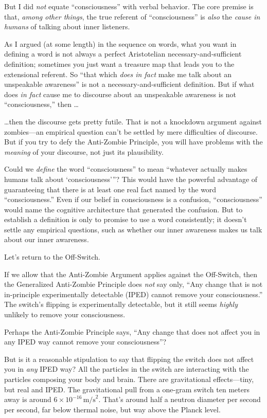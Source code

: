 {
 But I did \textit{not} equate
``consciousness'' with verbal
behavior. The core premise is that, \textit{among other things}, the
true referent of ``consciousness''
is \textit{also} the \textit{cause in humans} of talking about inner
listeners.}

{
 As I argued (at some length) in the sequence on words, what you
want in defining a word is not always a perfect Aristotelian
necessary-and-sufficient definition; sometimes you just want a treasure
map that leads you to the extensional referent. So
``that which \textit{does in fact} make me talk about
an unspeakable awareness'' is not a
necessary-and-sufficient definition. But if what does \textit{in fact}
cause me to discourse about an unspeakable awareness is not
``consciousness,'' then \ldots}

{
 \ldots then the discourse gets pretty futile. That is not a
knockdown argument against zombies---an empirical question
can't be settled by mere difficulties of discourse. But
if you try to defy the Anti-Zombie Principle, you will have problems
with the \textit{meaning} of your discourse, not just its
plausibility.}

{
 Could we \textit{define} the word
``consciousness'' to mean
``whatever actually makes humans talk about
`consciousness'''?
This would have the powerful advantage of guaranteeing that there is at
least one real fact named by the word
``consciousness.'' Even if our
belief in consciousness is a confusion,
``consciousness'' would name the
cognitive architecture that generated the confusion. But to establish a
definition is only to promise to use a word consistently; it
doesn't settle any empirical questions, such as whether
our inner awareness makes us talk about our inner awareness.}

{
 Let's return to the Off-Switch.}

{
 If we allow that the Anti-Zombie Argument applies against the
Off-Switch, then the Generalized Anti-Zombie Principle does
\textit{not} say only, ``Any change that is not
in-principle experimentally detectable (IPED) cannot remove your
consciousness.'' The switch's
flipping is experimentally detectable, but it still seems
\textit{highly} unlikely to remove your consciousness.}

{
 Perhaps the Anti-Zombie Principle says, ``Any
change that does not affect you in any IPED way cannot remove your
consciousness''?}

{
 But is it a reasonable stipulation to say that flipping the switch
does not affect you in \textit{any} IPED way? All the particles in the
switch are interacting with the particles composing your body and
brain. There are gravitational effects---tiny, but real and IPED. The
gravitational pull from a one-gram switch ten meters away is around $6 \times
 10^{-16}\, \mathrm{m/s}^2$.
That's around half a neutron diameter per second per
second, far below thermal noise, but way above the Planck level.}

